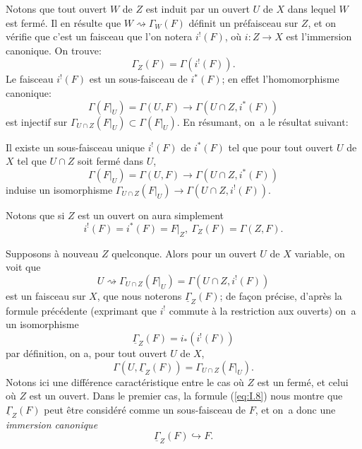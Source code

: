 Notons que tout ouvert $W$ de $Z$ est induit par un ouvert $U$ de $X$ dans lequel $W$ est ferm\'e. Il en r\'esulte que $W \rightsquigarrow \Gamma_W(F)$ d\'efinit un pr\'efaisceau sur $Z$, et on v\'erifie que c'est un faisceau que l'on notera $i^!(F)$, o\`u $i: Z \to X$ est l'immersion canonique. On trouve:
\begin{equation} \label{eq:I.5}
\Gamma_Z(F)=\Gamma(i^!(F)).
\end{equation}
Le faisceau $i^!(F)$ est un sous-faisceau de $i^*(F)$; en effet l'homomorphisme canonique:
$$
\Gamma(F|_{U})=\Gamma(U, F) \to \Gamma(U\cap Z, i^*(F))$$
est injectif sur $\Gamma_{U\cap Z}(F|_{U}) \subset \Gamma(F|_{U})$. En r\'esumant, on~a le r\'esultat suivant:

\begin{proposition} \label{I.1.1} Il existe un sous-faisceau unique $i^!(F)$ de $i^*(F)$ tel que pour tout ouvert $U$ de $X$ tel que $U\cap Z$ soit ferm\'e dans $U$,
$$
\Gamma(F|_{U})=\Gamma(U, F) \to \Gamma(U\cap Z, i^*(F))$$
induise un isomorphisme $\Gamma_{U \cap Z}(F|_{U}) \to \Gamma(U\cap Z, i^!(F))$.
\end{proposition}

Notons que si $Z$ est un ouvert on aura simplement
\begin{equation} \label{eq:I.6} {i^!(F)=i^*(F)=F|_{Z}, \ \Gamma_Z(F)=\Gamma(Z, F)}.
\end{equation}

Supposons \`a nouveau $Z$ quelconque. Alors pour un ouvert $U$ de $X$ variable, on voit que
$$
U \rightsquigarrow \Gamma_{U\cap
Z}(F|_{U})=\Gamma(U\cap Z, i^!(F))$$ est un faisceau sur $X$,
que nous noterons $\underline{\Gamma}_Z(F)$; de fa\c con pr\'ecise,
d'apr\`es la formule pr\'ec\'edente (exprimant que $i^!$ commute \`a la
restriction aux ouverts) on~a un isomorphisme
\begin{equation} \label{eq:I.7} {\underline{\Gamma}_Z(F)= i_*(i^!(F))}
\end{equation}
par d\'efinition, on a, pour tout ouvert $U$ de $X$,
\begin{equation} \label{eq:I.8} {\Gamma(U, \underline{\Gamma}_Z(F)) = \Gamma_{U\cap Z}(F|_{U})}.
\end{equation}
Notons ici une diff\'erence caract\'eristique entre le cas o\`u $Z$ est un ferm\'e, et celui o\`u $Z$ est un ouvert. Dans le premier cas, la formule (\ref{eq:I.8}) nous montre que $\underline{\Gamma}_Z(F)$ peut \^etre consid\'er\'e comme un sous-faisceau de $F$, et on~a donc une \textit{immersion canonique}
\begin{equation*} \label{eq:I.8'} \tag{$8'$} {\underline{\Gamma}_Z(F) \hookrightarrow F}.
\end{equation*}


